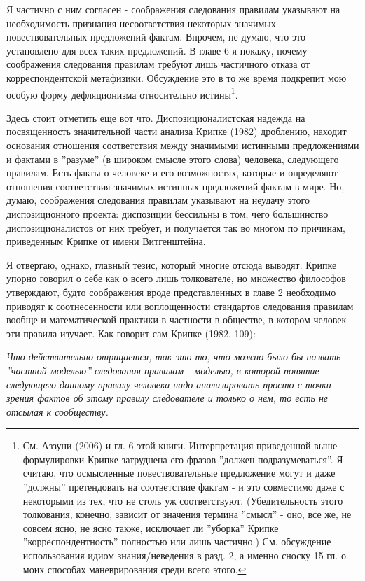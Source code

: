 \documentclass{book}
\begin{document}
\smallskip

Я частично с ним согласен - соображения следования правилам указывают на необходимость признания несоответствия некоторых значимых повествовательных предложений фактам. Впрочем, не думаю, что это установлено для всех таких предложений. В главе 6 я покажу, почему соображения следования правилам требуют лишь частичного отказа от корреспондентской метафизики. Обсуждение это в то же время подкрепит мою особую форму дефляционизма относительно истины\footnote{См. Аззуни (2006) и гл. 6 этой книги. Интерпретация приведенной выше формулировки Крипке затруднена его фразов ''должен подразумеваться''. Я считаю, что осмысленные повествовательные предложение могут и даже ''должны'' претендовать на соответствие фактам - и это совместимо даже с некоторыми из тех, что не столь уж соответствуют. (Убедительность этого толкования, конечно, зависит от значения термина ''смысл'' - оно, все же, не совсем ясно, не ясно также, исключает ли ''уборка'' Крипке ''корреспондентность'' полностью или лишь частично.) См. обсуждение использования идиом знания/неведения в разд. 2, а именно сноску 15 гл. о моих способах маневрирования среди всего этого.}.

Здесь стоит отметить еще вот что. Диспозиционалистская надежда на посвященность значительной части анализа Крипке (1982) дроблению, находит основания отношения соответствия между значимыми истинными предложениями и фактами в ''разуме'' (в широком смысле этого слова) человека, следующего правилам. Есть факты о человеке и его возможностях, которые и определяют отношения соответствия значимых истинных предложений фактам в мире. Но, думаю, соображения следования правилам указывают на неудачу этого диспозиционного проекта: диспозиции бессильны в том, чего большинство диспозиционалистов от них требует, и получается так во многом по причинам, приведенным Крипке от имени Витгенштейна.

Я отвергаю, однако, главный тезис, который многие отсюда выводят. Крипке упорно говорил о себе как о всего лишь толкователе, но множество философов утверждают, будто соображения вроде представленных в главе 2 необходимо приводят к соотнесенности или воплощенности стандартов следования правилам вообще и математической практики в частности в обществе, в котором человек эти правила изучает. Как говорит сам Крипке (1982, 109):

\smallskip

\textit{Что действительно отрицается, так это то, что можно было бы назвать ''частной моделью'' следования правилам - моделью, в которой понятие следующего данному правилу человека надо анализировать просто с точки зрения фактов об этому правилу следователе и только о нем, то есть не отсылая к сообществу.}
\end{document}
